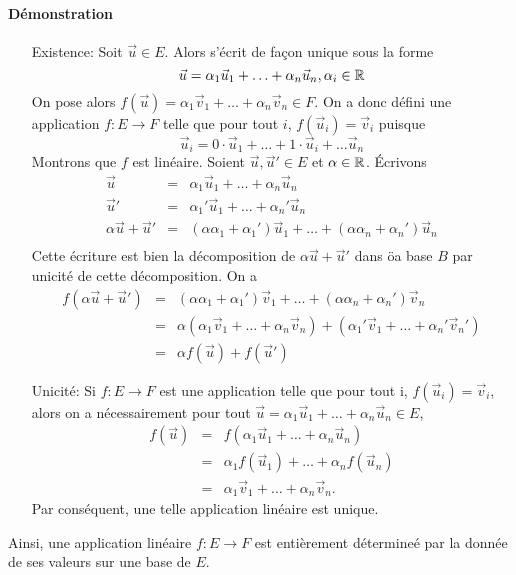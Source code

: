 \paragraph{Démonstration}
\begin{itemize}
  \item[Existence:] Soit $\vec{u} \in E$. Alors  s'écrit de façon unique sous la forme
    $$\vec{u} = \alpha_1 \vec{u}_1 + \ldots + \alpha_n \vec{u}_n, \alpha_i \in \mathbb{R}$$
    On pose alors $f(\vec{u}) = \alpha_1 \vec{v}_1 + \ldots + \alpha_n \vec{v}_n \in F$. On a donc défini une application $f: E \rightarrow F$ telle que pour tout $i$, $f(\vec{u}_i) = \vec{v}_i$ puisque
    $$\vec{u}_i = 0 \cdot \vec{u}_1 + \ldots + 1 \cdot \vec{u}_i + \ldots \vec{u}_n$$
    Montrons que $f$ est linéaire. Soient $\vec{u}, \vec{u}' \in E$ et $\alpha \in \mathbb{R}$. Écrivons 
    \begin{eqnarray*}
      \vec{u} &=& \alpha_1 \vec{u}_1 + \ldots + \alpha_n \vec{u}_n \\
      \vec{u}' &=& \alpha_1' \vec{u}_1 + \ldots + \alpha_n' \vec{u}_n \\
      \alpha \vec{u} + \vec{u}' &=& (\alpha \alpha_1 + \alpha_1') \vec{u}_1 + \ldots + (\alpha \alpha_n + \alpha_n') \vec{u}_n \\
    \end{eqnarray*}
    Cette écriture est bien la décomposition de $\alpha \vec{u} + \vec{u}'$ dans öa base $B$ par unicité de cette décomposition. On a
    \begin{eqnarray*}
      f(\alpha \vec{u} + \vec{u}') &=& (\alpha \alpha_1 + \alpha_1') \vec{v}_1 + \ldots + (\alpha \alpha_n + \alpha_n') \vec{v}_n \\
        &=& \alpha ( \alpha_1 \vec{v}_1 + \ldots + \alpha_n \vec{v}_n ) + (\alpha_1' \vec{v}_1 + \ldots + \alpha_n' \vec{v}_n') \\
        &=& \alpha f(\vec{u}) + f(\vec{u}')
    \end{eqnarray*}
    
  \item[Unicité:] Si $f: E \rightarrow F$ est une application telle que pour tout i, $f(\vec{u}_i) = \vec{v}_i$, alors on a nécessairement pour tout $\vec{u} = \alpha_1 \vec{u}_1 + \ldots + \alpha_n \vec{u}_n \in E$,
    \begin{eqnarray*}
      f(\vec{u}) &=& f(\alpha_1 \vec{u}_1 + \ldots + \alpha_n \vec{u}_n) \\
       &=& \alpha_1 f(\vec{u}_1) + \ldots + \alpha_n f(\vec{u}_n) \\
       &=& \alpha_1 \vec{v}_1 + \ldots + \alpha_n \vec{v}_n.
    \end{eqnarray*}
    Par conséquent, une telle application linéaire est unique.
\end{itemize}
Ainsi, une application linéaire $f: E \rightarrow F$ est entièrement détermineé par la donnée de ses valeurs sur une base de $E$.

